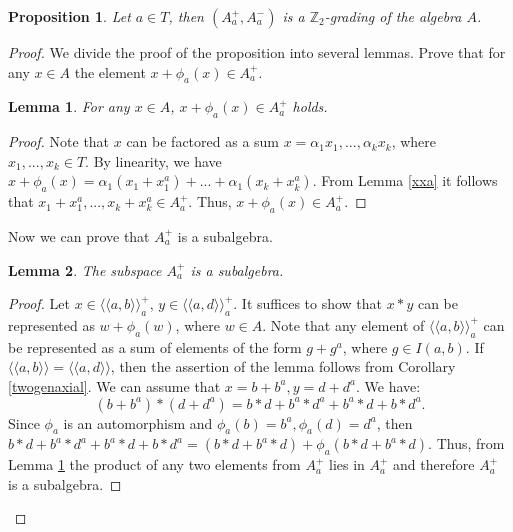\documentclass[12pt]{article}
\newcommand\Z{\mathbb{Z}}
\newcommand\la{\langle}
\newcommand\ra{\rangle}
\newcommand\lla{\la\!\la}
\newcommand\rra{\ra\!\ra}
\newtheorem{lem}{Lemma}
\newtheorem{prop}{Proposition}
\begin{document}
\begin{prop}\label{Zgrad}
Let $a\in T$, then $(A_a^+, A_a^-)$ is a $\Z_2$-grading of the algebra $A$.
\end{prop}
 \begin{proof} 
 We divide the proof of the proposition into several lemmas.
Prove that for any $x\in A$ the element $x+\phi_a (x)\in A_a^+$.
\begin{lem}\label{apluss}
For any $x\in A$, $x+\phi_a(x)\in A_a^+$ holds.
\end{lem}
\begin{proof}
Note that $x$ can be factored as a sum $x=\alpha_1x_1,...,\alpha_kx_k$, where $x_1,...,x_k\in T$. By linearity, we have $x+\phi_a(x)=\alpha_1(x_1+x_1^a)+...+\alpha_1(x_k+x_k^a)$. From Lemma \ref{xxa} it follows that $x_1+x_1^a,...,x_k+x_k^a \in A_a^+$. Thus, $x+\phi_a(x)\in A_a^+$.
\end{proof}

Now we can prove that $A_a^+$ is a subalgebra.

\begin{lem}\label{um}
	The subspace $A_a^+$ is a subalgebra.
\end{lem}
\begin{proof}
Let $x\in \lla a, b\rra _a^+$, $y\in \lla a,d\rra_a^+$.
It suffices to show that $x*y$ can be represented as $w+\phi_a(w)$, where $w\in A$. Note that any element of $\lla a, b\rra _a^+$ can be represented as a sum of elements of the form $g+g^a$, where $g\in I(a,b)$. If $\lla a, b\rra=\lla a, d\rra$, then the assertion of the lemma follows from Corollary \ref{twogenaxial}. We can assume that $x=b+b^a, y=d+d^a$. We have:
$$(b+b^a)*(d+d^a)=b*d +b^a*d^a+b^a*d+b*d^a.$$
Since $\phi_a$ is an automorphism and $\phi_a(b)=b^a, \phi_a(d)=d^a$, then $b*d +b^a*d^a+b^a*d+b*d^a=(b*d+b^a*d)+\phi_a(b*d+b^a*d)$. Thus, from Lemma \ref{apluss} the product of any two elements from $A_a^+$ lies in $A_a^+$ and therefore $A_a^+$ is a subalgebra.

\end{proof}


\end{proof}
\end{document}
